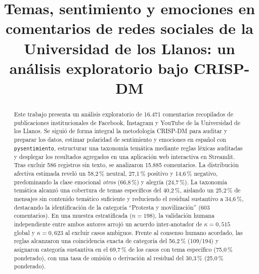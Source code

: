 \documentclass[conference]{IEEEtran}
\newcommand{\pc}{\,\%}
\begin{document}
\title{Temas, sentimiento y emociones en comentarios de redes sociales de la Universidad de los Llanos: un an\'alisis exploratorio bajo CRISP-DM}

\author{
\and
{}
}

\maketitle

\begin{abstract}
Este trabajo presenta un an\'alisis exploratorio de 16.471 comentarios recopilados de publicaciones institucionales de Facebook, Instagram y YouTube de la Universidad de los Llanos. Se sigui\'o de forma integral la metodolog\'ia CRISP-DM para auditar y preparar los datos, estimar polaridad de sentimiento y emociones en espa\~nol con \texttt{pysentimiento}, estructurar una taxonom\'ia tem\'atica mediante reglas l\'exicas auditadas y desplegar los resultados agregados en una aplicaci\'on web interactiva en Streamlit. Tras excluir 586 registros sin texto, se analizaron 15.885 comentarios. La distribuci\'on afectiva estimada revel\'o un 58,2\pc{} neutral, 27,1\pc{} positivo y 14,6\pc{} negativo, predominando la clase emocional \emph{otros} (66,8\pc) y alegr\'ia (24,7\pc). La taxonom\'ia tem\'atica alcanz\'o una cobertura de temas espec\'ificos del 40,2\pc, aislando un 25,2\pc{} de mensajes sin contenido tem\'atico suficiente y reduciendo el residual sustantivo a 34,6\pc, destacando la identificaci\'on de la categor\'ia ``Protesta y movilizaci\'on'' (603 comentarios). En una muestra estratificada ($n = 198$), la validaci\'on humana independiente entre ambos autores arroj\'o un acuerdo inter-anotador de $\kappa = 0,515$ global y $\kappa = 0,623$ al excluir casos ambiguos. Frente al consenso humano acordado, las reglas alcanzaron una coincidencia exacta de categor\'ia del 56,2\pc{} (109/194) y asignaron categor\'ia sustantiva en el 69,7\pc{} de los casos con tema espec\'ifico (75,0\pc{} ponderado), con una tasa de omisi\'on o derivaci\'on al residual del 30,3\pc{} (25,0\pc{} ponderado).
\end{abstract}
\end{document}
